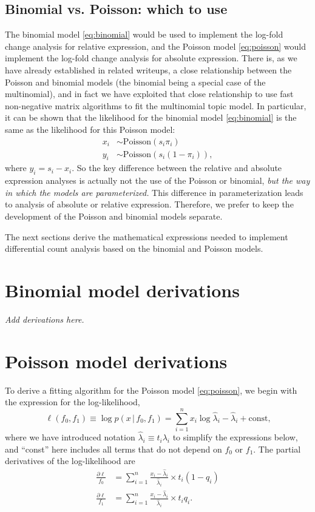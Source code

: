 \documentclass[final]{siamart171218}
\begin{document}
\subsection{Binomial vs. Poisson: which to use}

The binomial model \eqref{eq:binomial} would be used to implement the
log-fold change analysis for relative expression, and the Poisson
model \eqref{eq:poisson} would implement the log-fold change analysis
for absolute expression. There is, as we have already established in
related writeups, a close relationship between the Poisson and
binomial models (the binomial being a special case of the
multinomial), and in fact we have exploited that close relationship to
use fast non-negative matrix algorithms to fit the multinomial topic
model. In particular, it can be shown that the likelihood for the
binomial model \eqref{eq:binomial} is the same as the likelihood for
this Poisson model:
\begin{align*}
x_i &\sim \mathrm{Poisson}(s_i \pi_i) \\
y_i &\sim \mathrm{Poisson}(s_i(1-\pi_i)),
\end{align*}
where $y_i = s_i - x_i$. So the key difference between the relative
and absolute expression analyses is actually not the use of the
Poisson or binomial, {\em but the way in which the models are
  parameterized.} This difference in parameterization leads to
analysis of absolute or relative expression. Therefore, we prefer to
keep the development of the Poisson and binomial models separate.

The next sections derive the mathematical expressions needed to
implement differential count analysis based on the binomial and
Poisson models.

\section{Binomial model derivations}

{\em Add derivations here.}

\section{Poisson model derivations}

To derive a fitting algorithm for the Poisson model
\eqref{eq:poisson}, we begin with the expression for the
log-likelihood,
\begin{equation}
\ell(f_0, f_1) \equiv \log p(x \,|\, f_0, f_1) = 
\sum_{i=1}^n x_i \log \hat{\lambda}_i - \hat{\lambda}_i +
\mbox{const,}
\label{eq:loglik-poisson}
\end{equation}
where we have introduced notation $\hat{\lambda}_i \equiv t_i
\lambda_i$ to simplify the expressions below, and ``const'' here
includes all terms that do not depend on $f_0$ or $f_1$. The partial
derivatives of the log-likelihood are
\begin{align}
\frac{\partial\ell}{f_0} &= 
\sum_{i=1}^n \frac{x_i - \hat{\lambda}_i}{\hat{\lambda}_i} \times t_i(1-q_i) \\
\frac{\partial\ell}{f_1} &= 
\sum_{i=1}^n \frac{x_i - \hat{\lambda}_i}{\hat{\lambda}_i} \times t_iq_i.
\end{align}
\end{document}
